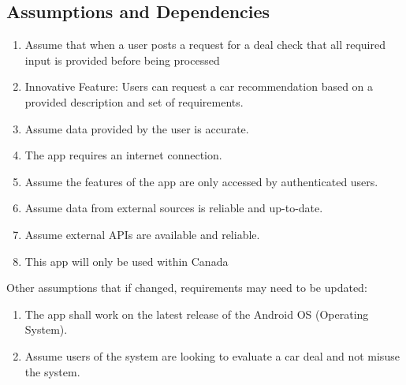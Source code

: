 \documentclass[]{article}
\begin{document}
\subsection{Assumptions and Dependencies}
\label{sub:assumptions_and_dependencies}
\begin{enumerate}
\item Assume that when a user posts a request for a deal check that all required input is provided before being processed
\item Innovative Feature: Users can request a car recommendation based on a provided description and set of requirements.
\item Assume data provided by the user is accurate.
\item The app requires an internet connection.
\item Assume the features of the app are only accessed by authenticated users.
\item Assume data from external sources is reliable and up-to-date.
\item Assume external APIs are available and reliable.
\item This app will only be used within Canada
\end{enumerate}

Other assumptions that if changed, requirements may need to be updated:
\begin{enumerate}
\item The app shall work on the latest release of the Android OS (Operating System).
\item Assume users of the system are looking to evaluate a car deal and not misuse the system.
\end{enumerate}
\end{document}
